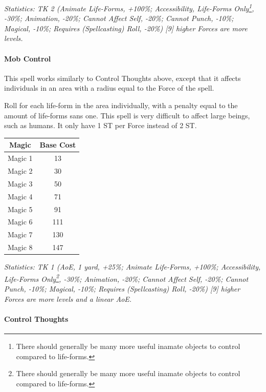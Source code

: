 \begin{multicols}{3}
	\textcolor{OliveGreen}{\textit{Statistics: TK 2 (Animate Life-Forms, +100\%; Accessibility, Life-Forms Only\footnote{There should generally be many more useful inamate objects to control compared to life-forms.}, -30\%; Animation, -20\%; Cannot Affect Self, -20\%; Cannot Punch, -10\%; Magical, -10\%; Requires (Spellcasting) Roll, -20\%) [9] higher Forces are more levels. }}
	
	\paragraph{Mob Control}
	
	This spell works similarly to Control Thoughts above, except that it affects individuals in an area with a radius equal to the Force of the spell.
	
	Roll for each life-form in the area individually, with a penalty equal to the amount of life-forms sans one.
	This spell is very difficult to affect large beings, such as humans. It only have 1 ST per Force instead of 2 ST.
	
	\begin{center}
		\begin{tabular}{|c|c|}
			\hline
			Magic & Base Cost \\
			\hline
			\hline
			Magic 1 & 13 \\
			Magic 2 & 30 \\
			Magic 3 & 50 \\
			Magic 4 & 71 \\
			Magic 5 & 91 \\
			Magic 6 & 111 \\
			Magic 7 & 130 \\
			Magic 8 & 147 \\
			\hline
		\end{tabular}
	\end{center}
		
	\textcolor{OliveGreen}{\textit{Statistics: TK 1 (AoE, 1 yard, +25\%; Animate Life-Forms, +100\%; Accessibility, Life-Forms Only\footnote{There should generally be many more useful inamate objects to control compared to life-forms.}, -30\%; Animation, -20\%; Cannot Affect Self, -20\%; Cannot Punch, -10\%; Magical, -10\%; Requires (Spellcasting) Roll, -20\%) [9] higher Forces are more levels and a linear AoE. }} 

	\paragraph{Control Thoughts}
	

\end{multicols}
